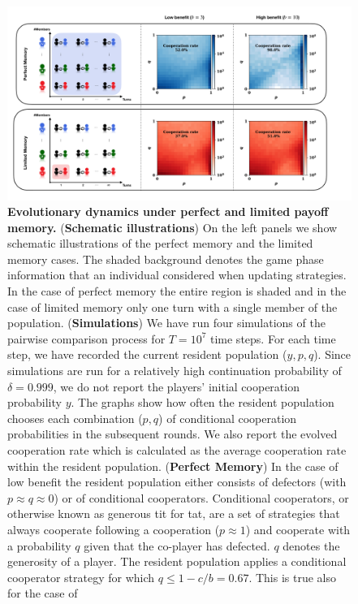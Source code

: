 \documentclass[11pt]{article}
\theoremstyle{plainCl1}
\theoremstyle{plainCl2}
\begin{document}
\begin{figure}[!htbp]
    \centering
    \includegraphics[width=\textwidth]{static/donation_expected_last_round_summary_results.pdf}
    \caption{{\bf Evolutionary dynamics under perfect and limited payoff memory.}
    ({\bf Schematic illustrations}) On the left panels we show schematic
    illustrations of the perfect memory and the limited memory cases. The shaded
    background denotes the game phase information that an individual considered
    when updating strategies. In the case of perfect memory the entire region is
    shaded and in the case of limited memory only one turn with a single member
    of the population. ({\bf Simulations}) We have run four simulations of the
    pairwise comparison process for $T\!=\!10^7$ time steps. For each time step,
    we have recorded the current resident population ($y,p,q$). Since
    simulations are run for a relatively high continuation probability of
    $\delta\!=\!0.999$, we do not report the players' initial cooperation
    probability $y$. The graphs show how often the resident population chooses
    each combination ($p,q$) of conditional cooperation probabilities in the
    subsequent rounds. We also report the evolved cooperation rate which is
    calculated as the average cooperation rate within the resident population.
    ({\bf Perfect Memory}) In the case of low benefit the resident population
    either consists of defectors (with $p\!\approx\!q\!\approx\!0$) or of
    conditional cooperators. Conditional cooperators, or otherwise known as
    generous tit for tat, are a set of strategies that always cooperate
    following a cooperation ($p\!\approx\!1\!$) and cooperate with a probability
    $q$ given that the co-player has defected. $q$ denotes the generosity of a
    player. The resident population applies a conditional cooperator strategy
    for which $q\!\le\!1\!-\!c/b\!=\!0.67$. This is true also for the case of
}
\end{figure}
\end{document}
